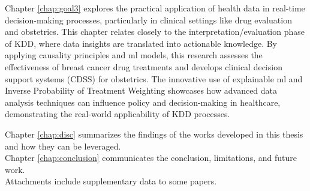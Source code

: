 Chapter \ref{chap:goal3} explores the practical application of health data in real-time decision-making processes, particularly in clinical settings like drug evaluation and obstetrics. This chapter relates closely to the interpretation/evaluation phase of KDD, where data insights are translated into actionable knowledge. By applying causality principles and \acl{ml} models, this research assesses the effectiveness of breast cancer drug treatments and develops clinical decision support systems (CDSS) for obstetrics. The innovative use of explainable \ac{ml} and Inverse Probability of Treatment Weighting showcases how advanced data analysis techniques can influence policy and decision-making in healthcare, demonstrating the real-world applicability of KDD processes.


Chapter \ref{chap:disc} summarizes the findings of the works developed in this thesis and how they can be leveraged. \\

Chapter \ref{chap:conclusion} communicates the conclusion, limitations, and future work.\\

Attachments include supplementary data to some papers.

